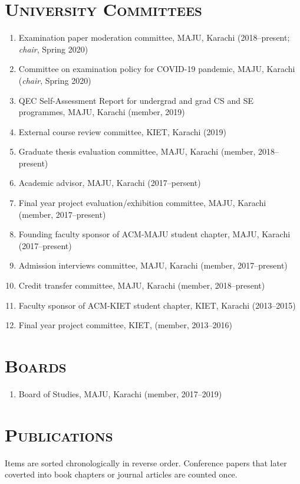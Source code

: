 \documentclass[a4paper, 10pt]{article}
\begin{document}
\section*{\normalfont\textsc{University Committees}}
\begin{enumerate}
\itemsep-4pt 
\item Examination paper moderation committee, MAJU, Karachi (2018--present; \emph{chair}, Spring 2020)
\item Committee on examination policy for COVID-19 pandemic, MAJU, Karachi (\emph{chair}, Spring 2020)
\item QEC Self-Assessment Report for undergrad and grad CS and SE programmes, MAJU, Karachi (member, 2019)
\item External course review committee, KIET, Karachi (2019)
\item Graduate thesis evaluation committee, MAJU, Karachi (member, 2018--present)
\item Academic advisor, MAJU, Karachi (2017--persent)
\item Final year project evaluation/exhibition committee, MAJU, Karachi (member, 2017--present)
\item Founding faculty sponsor of ACM-MAJU student chapter, MAJU, Karachi (2017--present)
\item Admission interviews committee, MAJU, Karachi (member, 2017--present)
\item Credit transfer committee, MAJU, Karachi (member, 2018--present)
\item Faculty sponsor of ACM-KIET student chapter, KIET, Karachi (2013--2015)
\item Final year project committee, KIET, (member, 2013--2016)
\end{enumerate}

\section*{\normalfont\textsc{Boards}}
\begin{enumerate}
\itemsep-4pt 
\item Board of Studies, MAJU, Karachi (member, 2017--2019)
\end{enumerate}

\section*{\normalfont\textsc{Publications}}
\vspace{-1em}Items are sorted chronologically in reverse order. Conference papers that later coverted into book chapters or journal articles are counted once.
\end{document}
